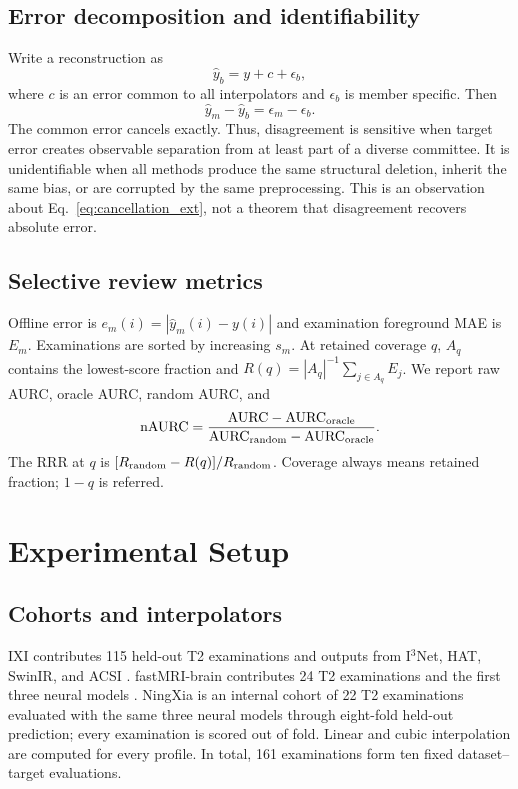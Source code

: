\documentclass{article}
\begin{document}
\subsection{Error decomposition and identifiability}
Write a reconstruction as
\begin{equation}
 \hat y_b=y+c+\epsilon_b,
 \label{eq:model_ext}
\end{equation}
where $c$ is an error common to all interpolators and $\epsilon_b$ is member specific. Then
\begin{equation}
 \hat y_m-\hat y_b=\epsilon_m-\epsilon_b.
 \label{eq:cancellation_ext}
\end{equation}
The common error cancels exactly. Thus, disagreement is sensitive when target error creates observable separation from at least part of a diverse committee. It is unidentifiable when all methods produce the same structural deletion, inherit the same bias, or are corrupted by the same preprocessing. This is an observation about Eq.~\eqref{eq:cancellation_ext}, not a theorem that disagreement recovers absolute error.

\subsection{Selective review metrics}
Offline error is $e_m(i)=|\hat y_m(i)-y(i)|$ and examination foreground MAE is $E_m$. Examinations are sorted by increasing $s_m$. At retained coverage $q$, $A_q$ contains the lowest-score fraction and $R(q)=|A_q|^{-1}\sum_{j\in A_q}E_j$. We report raw AURC, oracle AURC, random AURC, and
\begin{equation}
 \mathrm{nAURC}=\frac{\mathrm{AURC}-\mathrm{AURC}_{\rm oracle}}
 {\mathrm{AURC}_{\rm random}-\mathrm{AURC}_{\rm oracle}}.
\end{equation}
The RRR at $q$ is $[R_{\rm random}-R(q)]/R_{\rm random}$. Coverage always means retained fraction; $1-q$ is referred.

\section{Experimental Setup}

\subsection{Cohorts and interpolators}
IXI contributes 115 held-out T2 examinations and outputs from I$^3$Net, HAT, SwinIR, and ACSI \cite{ixi}. fastMRI-brain contributes 24 T2 examinations and the first three neural models \cite{zbontar2018fastmri}. NingXia is an internal cohort of 22 T2 examinations evaluated with the same three neural models through eight-fold held-out prediction; every examination is scored out of fold. Linear and cubic interpolation are computed for every profile. In total, 161 examinations form ten fixed dataset--target evaluations.
\end{document}
